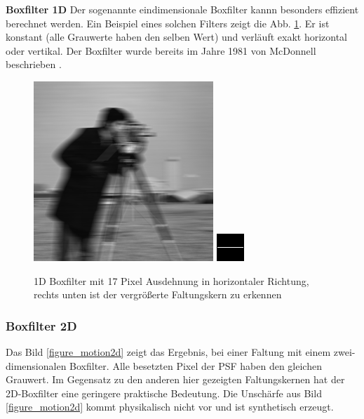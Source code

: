 \documentclass[a4paper,12pt]{article}
\begin{document}
\textbf{Boxfilter 1D}
Der sogenannte eindimensionale Boxfilter kannn besonders effizient berechnet
werden. Ein Beispiel eines solchen Filters zeigt die Abb. \ref{figure_motion}. 
Er ist konstant (alle Grauwerte haben den selben Wert) und verläuft 
exakt horizontal oder vertikal. Der Boxfilter wurde bereits im Jahre 1981
von McDonnell beschrieben \cite{mcdonnell}.
 
\begin{figure}[htbp]
\centering
\includegraphics[scale=0.8]{move17.png}
\includegraphics[scale=2.1]{kern1D37px.png}
\caption{1D Boxfilter mit 17 Pixel Ausdehnung in horizontaler Richtung, rechts
unten ist der vergrößerte Faltungskern zu erkennen}
\label{figure_motion}
\end{figure}



\subsubsection{Boxfilter 2D}
Das Bild \ref{figure_motion2d} zeigt das Ergebnis, bei einer Faltung mit einem
zwei-dimensionalen Boxfilter. Alle besetzten Pixel der PSF haben den gleichen
Grauwert.
Im Gegensatz zu den anderen hier gezeigten Faltungskernen hat der
2D-Boxfilter eine geringere praktische Bedeutung. Die Unschärfe aus Bild
\ref{figure_motion2d} kommt physikalisch nicht vor und ist synthetisch erzeugt.
\end{document}
